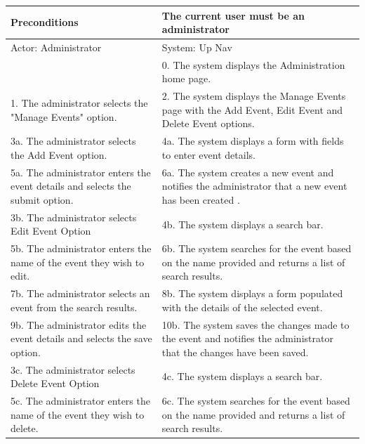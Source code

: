 \documentclass{article}
\begin{document}
\begin{enumerate}
\begin{center}
\begin{enumerate}
\begin{enumerate}
	\begin{table}[H]
	\centering
		\begin{tabular}{ | p{15em} | p{15em}| }
		\hline
		Preconditions                                                       										& The current user must be an administrator \\ 				
		\hline
		Actor: Administrator                                                       									& System: Up Nav \\ 			
		\hline
                                                                  													& 0. The system displays the Administration home page. \\                                                           
		 \hline
		1. The administrator selects the "Manage Events" option.									& 2. The system displays the Manage Events page with the Add Event, Edit Event and Delete Event options. \\
		\hline							
		3a. The administrator selects the Add Event option.										& 4a. The system displays a form with fields to enter event details. \\
		 \hline
		5a. The administrator enters the event details and selects the submit option. 						& 6a.  The system creates a new event and notifies the administrator that a new event has been created . \\
		\hline
		3b. The administrator selects Edit Event Option										& 4b. The system displays a search bar.\\
		\hline
		5b. The administrator enters the name of the event they wish to edit.							& 6b. The system searches for the event based on the name provided and returns a list of search results. \\
		\hline
		7b. The administrator selects an event from the search results.								& 8b. The system displays a form populated with the details of the selected event. \\
		\hline
		9b. The administrator edits the event details and selects the save option.						& 10b. The system saves the changes made to the event and notifies the administrator that the changes have been saved. \\
		\hline
		3c. The administrator selects Delete Event Option										& 4c. The system displays a search bar.\\
		\hline
		5c. The administrator enters the name of the event they wish to delete.							& 6c. The system searches for the event based on the name provided and returns a list of search results. \\

\end{tabular}
\end{table}
\end{enumerate}
\end{enumerate}
\end{center}
\end{enumerate}
\end{document}
